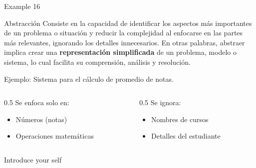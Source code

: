 \documentclass[aspectratio=169]{beamer}
\renewcommand{\alert}[1]{\textbf{\color{swufe}#1}}
\newcommand{\alertplain}[1]{{\color{swufe}#1}}
\begin{document}
    \begin{frame}{Example 16}
        \begin{exampleblock}{Abstracción}
            Consiste en la capacidad de identificar los aspectos más importantes de un problema o situación y reducir la complejidad al enfocarse en las partes más relevantes, ignorando los detalles innecesarios. En otras palabras, abstraer implica crear una \alert{representación  simplificada} de un problema, modelo o sistema, lo cual facilita su comprensión, análisis y resolución. \\
        \end{exampleblock}

        \alertplain{Ejemplo:} Sistema para el cálculo de promedio de notas. \newline

        \begin{columns}[t] %
            \begin{column}{0.5\textwidth}
                \hspace{0.2cm} Se enfoca solo en:
                \begin{itemize}
                    \item Números (notas)
                    \item Operaciones matemáticas
                \end{itemize}
            \end{column}
            
            \begin{column}{0.5\textwidth}
                Se ignora:
                \begin{itemize}
                    \item Nombres de cursos
                    \item Detalles del estudiante
                \end{itemize}
            \end{column}
        \end{columns}

        \begin{note}
            {Introduce your self}
        \end{note}
    \end{frame}
\end{document}
